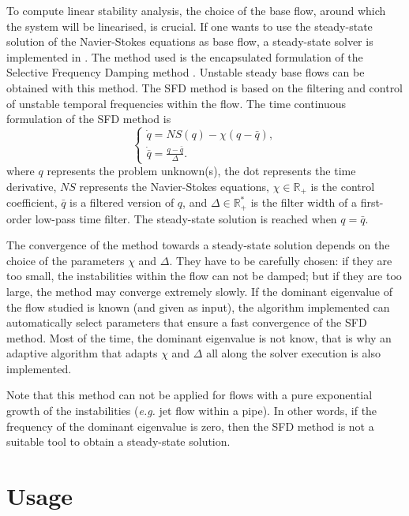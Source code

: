 To compute linear stability analysis, the choice of the base flow,
around which the system will be linearised, is crucial. If one wants
to use the steady-state solution of the Navier-Stokes equations as
base flow, a steady-state solver is implemented in \nekpp. The method
used is the encapsulated formulation of the Selective Frequency
Damping method \cite{JoCoSh14}. Unstable steady base flows can be
obtained with this method. The SFD method is based on the filtering
and control of unstable temporal frequencies within the flow. The time
continuous formulation of the SFD method is
\begin{equation}
\begin{cases}
\dot{q}=NS(q)-\chi (q-\bar{q}), \\
\dot{\bar{q}}=\frac{q-\bar{q}}{\Delta}.
\end{cases}
\label{SFD-General}
\end{equation}
where $q$ represents the problem unknown(s), the dot represents the time derivative, $NS$ represents the Navier-Stokes equations, $\chi \in \mathbb{R}_+$ is the control coefficient, $\bar{q}$ is a filtered version of $q$, and $\Delta \in \mathbb{R}_+ ^*$ is the filter width of a first-order low-pass time filter. The steady-state solution is reached when $q=\bar{q}$.

The convergence of the method towards a steady-state solution depends on the choice of the parameters $\chi$ and $\Delta$. They have to be carefully chosen: if they are too small, the instabilities within the flow can not be damped; but if they are too large, the method may converge extremely slowly. If the dominant eigenvalue of the flow studied is known (and given as input), the algorithm implemented can automatically select parameters that ensure a fast convergence of the SFD method. Most of the time, the dominant eigenvalue is not know, that is why an adaptive algorithm that adapts $\chi$ and $\Delta$ all along the solver execution is also implemented.

Note that this method can not be applied for flows with a pure exponential growth of the instabilities (\textit{e.g.} jet flow within a pipe). In other words, if the frequency of the dominant eigenvalue is zero, then the SFD method is not a suitable tool to obtain a steady-state solution.



\section{Usage}

